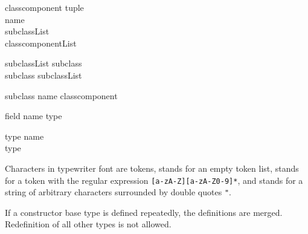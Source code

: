 \begin{production}{classcomponent}
\term{\{} tuple \term{\}} \\
name \\
subclassList \\
\term{(} classcomponentList \term{)} \\
\end{production}

\begin{production}{subclassList}
subclass \\
subclass \term{|} subclassList \\
\end{production}

\begin{production}{subclass}
name \term{:} classcomponent \\
\end{production}

\begin{production}{field}
name \term{:} type \\
\end{production}

\begin{production}{type}
name \\
\term{[} type \term{]} \\
\end{production}

Characters in typewriter font  are tokens,
{\emptystring} stands for an empty token list,
 stands for a token with the regular expression
\verb![a-zA-Z][a-zA-Z0-9]*!,
and  stands for a string of arbitrary characters
surrounded by double quotes \verb+"+.
\par
If a constructor base type is defined repeatedly, the definitions
are merged. Redefinition of all other types is not allowed.
